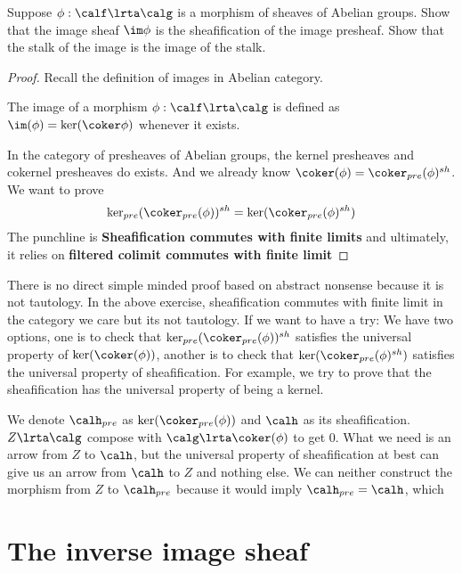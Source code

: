 \begin{exr}
Suppose $\phi:\calf\lrta \calg$ is a morphism of sheaves of Abelian groups. Show that the image sheaf $\im \phi$ is the sheafification of the image presheaf. Show that the stalk of the image is the image of the stalk.
\end{exr}
\begin{proof}
Recall the definition of images in Abelian category.

The image of a morphism $\phi : \calf \lrta \calg$ is defined as $\im(\phi) = \ker(\coker \phi)$ whenever it exists.

In the category of presheaves of Abelian groups, the kernel presheaves and cokernel presheaves do exists. And we already know $\coker(\phi)=\coker_{pre}(\phi)^{sh}$. We want to prove
$$
\ker_{pre}(\coker_{pre}(\phi))^{sh}=\ker(\coker_{pre}(\phi)^{sh})
$$
The punchline is \textbf{Sheafification commutes with finite limits} and ultimately, it relies on \textbf{filtered colimit commutes with finite limit}

\end{proof}
\begin{remark}
There is no direct simple minded proof based on abstract nonsense because it is not tautology. In the above exercise, sheafification commutes with finite limit in the category we care but its not tautology. If we want to have a try: We have two options, one is to check that $\ker_{pre}(\coker_{pre}(\phi))^{sh}$ satisfies the universal property of $\ker(\coker(\phi))$, another is to check that $\ker(\coker_{pre}(\phi)^{sh})$ satisfies the universal property of sheafification. For example, we try to prove that the sheafification has the universal property of being a kernel.
\begin{center}
\end{center}
We denote $\calh_{pre}$ as $\ker(\coker_{pre}(\phi))$ and $\calh$ as its sheafification.
$Z\lrta \calg$ compose with $\calg\lrta \coker(\phi)$ to get $0$.
What we need is an arrow from $Z$ to $\calh$, but the universal property of sheafification at best can give us an arrow from $\calh$ to $Z$ and nothing else. We can neither construct the morphism from $Z$ to $\calh_{pre}$ because it would imply $\calh_{pre}=\calh$, which 
\end{remark}
\section{The inverse image sheaf}